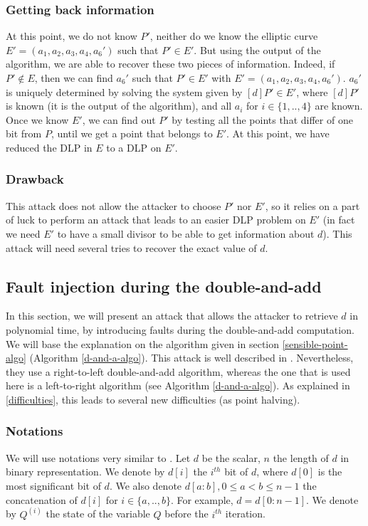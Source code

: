 \documentclass[journal]{IEEEtran}
\begin{document}
\subsubsection{Getting back information}
At this point, we do not know $P'$, neither do we know the elliptic curve $E' = (a_1, a_2, a_3, a_4, a_6')$
such that $P' \in E'$. But using the output of the algorithm, we are able to recover these two pieces of information.
Indeed, if $P' \notin E$, then we can find $a_6'$ such that $P' \in E'$ with $E' = (a_1, a_2, a_3, a_4, a_6')$. $a_6'$ is uniquely determined by solving
the system given by $[d]P' \in E'$, where $[d]P'$ is known (it is the output of the algorithm), 
and all $a_i$ for $i \in \{1, .., 4\}$ are known. 
Once we know $E'$, we can find out $P'$ by testing all the points that differ of one bit from $P$, until we get a point that belongs to $E'$.
At this point, we have reduced the DLP in $E$ to a DLP on $E'$. \\

\subsubsection{Drawback}
This attack does not allow the attacker to choose $P'$ nor $E'$, so it relies on a part of luck to perform an attack
that leads to an easier DLP problem on $E'$ (in fact we need $E'$ to have a small divisor to be able to
get information about $d$). This attack will need several tries to recover the exact value of $d$.

\subsection{Fault injection during the double-and-add}
\label{attack-powa}
In this section, we will present an attack that allows the attacker to retrieve $d$ in polynomial time, by
introducing faults during the double-and-add computation. We will base the explanation on the algorithm given
in section \ref{sensible-point-algo} (Algorithm \ref{d-and-a-algo}). This attack is well described in \cite{biehl2000differential}.
Nevertheless, they use a right-to-left double-and-add algorithm, whereas the one that is used here is a left-to-right algorithm (see Algorithm \ref{d-and-a-algo}).
As explained in \ref{difficulties}, this leads to several new difficulties (as point halving).\\

\subsubsection{Notations}
We will use notations very similar to \cite{biehl2000differential}.
Let $d$ be the scalar, $n$ the length of $d$ in binary representation. We denote by $d[i]$ the $i^{th}$ bit of $d$, 
where $d[0]$ is the most significant bit of $d$. We also denote $d[a:b], 0 \leq a < b \leq n-1$ the concatenation of $d[i]$ for $i \in \{a, .., b\}$.
For example, $d = d[0:n-1]$.
We denote by $Q^{(i)}$ the state of the variable $Q$ before the $i^{th}$ iteration.\\
\end{document}
